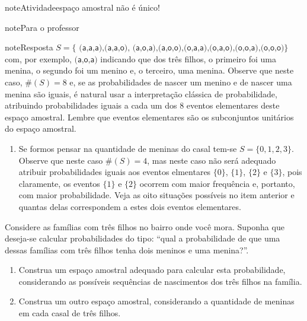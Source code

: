 \begin{sphinxadmonition}{note}{Atividade}{espaço amostral não é único!}
\begin{sphinxadmonition}{note}{Para o professor}
\begin{sphinxadmonition}{note}{Resposta}
\(S=\{\textsf{ (a,a,a),(a,a,o), (a,o,a),(a,o,o),(o,a,a),(o,a,o),(o,o,a),(o,o,o)}\}\)
com, por exemplo, \(\textsf{(a,o,a)}\) indicando que dos três filhos, o primeiro foi uma menina, o segundo foi um menino e, o terceiro, uma menina. Observe que neste caso, \(\#(S)=8\) e, se as probabilidades de nascer um menino e de nascer uma menina são iguais, é natural usar a interpretação clássica de probabilidade, atribuindo probabilidades iguais a cada um dos 8 eventos elementares deste espaço amostral. Lembre que eventos elementares são os subconjuntos unitários do espaço amostral.
\begin{enumerate}
\item {} 
Se formos pensar na quantidade de meninas do casal tem-se \(S=\{0,1,2,3\}\). Observe que neste caso \(\#(S)=4\), mas neste caso não será adequado atribuir probabilidades iguais aos eventos elmentares \(\{0\}\), \(\{1\}\),  \(\{2\}\) e \(\{3\}\), pois claramente, os eventos \(\{1\}\) e \(\{2\}\) ocorrem com maior frequência e, portanto, com maior probabilidade. Veja as oito situações possíveis no item anterior e quantas delas correspondem a estes dois eventos elementares.

\end{enumerate}
\end{sphinxadmonition}
\end{sphinxadmonition}

Considere as famílias com três filhos no bairro onde você mora. Suponha que deseja-se calcular probabilidades do tipo: “qual a probabilidade de que uma dessas famílias com três filhos tenha dois meninos e uma menina?”.
\begin{enumerate}
\item {} 
Construa um espaço amostral adequado para calcular esta probabilidade, considerando as possíveis sequências de nascimentos dos três filhos na família.

\item {} 
Construa um outro espaço amostral, considerando a quantidade de meninas em cada casal de três filhos.

\end{enumerate}
\end{sphinxadmonition}
